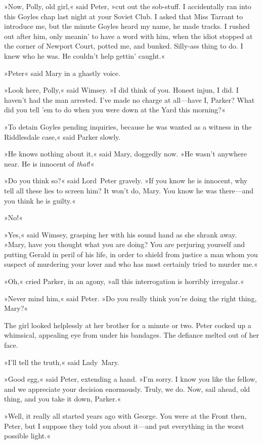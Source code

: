 »Now, Polly, old girl,« said Peter, »cut out the sob-stuff. I accidentally ran into this Goyles chap last night at your Soviet Club.  I asked that Miss Tarrant to introduce me, but the minute Goyles heard my name, he made tracks. I rushed out after him, only meanin' to have a word with him, when the idiot stopped at the corner of Newport Court, potted me, and bunked. Silly-ass thing to do. I knew who he was. He couldn't help gettin' caught.«

»Peter\longdash« said Mary in a ghastly voice.

»Look here, Polly,« said Wimsey. »I did think of you. Honest injun, I did. I haven't had the man arrested. I've made no charge at all—have I, Parker? What did you tell 'em to do when you were down at the Yard this morning?«

»To detain Goyles pending inquiries, because he was wanted as a witness in the Riddlesdale case,« said Parker slowly.

»He knows nothing about it,« said Mary, doggedly now. »He wasn't anywhere near. He is innocent of \textit{that}!«

»Do you think so?« said Lord~Peter gravely. »If you know he is innocent, why tell all these lies to screen him? It won't do, Mary. You know he was there—and you think he is guilty.«

»No!«

»Yes,« said Wimsey, grasping her with his sound hand as she shrank away. »Mary, have you thought what you are doing? You are perjuring yourself and putting Gerald in peril of his life, in order to shield from justice a man whom you suspect of murdering your lover and who has most certainly tried to murder me.«

»Oh,« cried Parker, in an agony, »all this interrogation is horribly irregular.«

»Never mind him,« said Peter. »Do you really think you're doing the right thing, Mary?«

The girl looked helplessly at her brother for a minute or two. Peter cocked up a whimsical, appealing eye from under his bandages. The defiance melted out of her face.

»I'll tell the truth,« said Lady~Mary.

»Good egg,« said Peter, extending a hand. »I'm sorry. I know you like the fellow, and we appreciate your decision enormously. Truly, we do.  Now, sail ahead, old thing, and you take it down, Parker.«

»Well, it really all started years ago with George. You were at the Front then, Peter, but I suppose they told you about it—and put everything in the worst possible light.«

